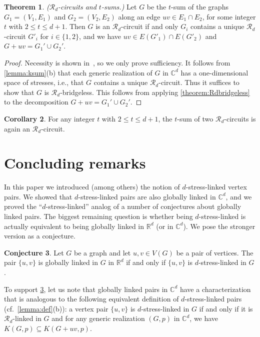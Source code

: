 \documentclass[11pt,a4paper,dvipsnames]{scrartcl}
\theoremstyle{definition}
\newtheorem{theorem}{Theorem}[section]
\newtheorem{corollary}[theorem]{Corollary}
\newtheorem{conjecture}[theorem]{Conjecture}
\newcommand{\RR}{\mathbb{R}}
\newcommand{\CC}{\mathbb{C}}
\newcommand{\strongly}[1]{${#1}$-stress-linked}
\newcommand{\sharedstresskernel}[1]{K}
\begin{document}
\begin{theorem}\label{theorem:tsumcircuitstronger} \emph{($\mathcal{R}_d$-circuits and $t$-sums.)} \newline
    Let $G$ be the $t$-sum of the graphs $G_1 = (V_1,E_1)$ and $G_2 = (V_2,E_2)$ along an edge $uv \in E_1 \cap E_2$, for some integer $t$ with $2 \leq t \leq d+1$. Then $G$ is an $\mathcal{R}_d$-circuit if and only $G_i$ contains a unique $\mathcal{R}_d$-circuit $G'_i$ for $i \in \{1,2\}$, and we have $uv \in E(G'_1) \cap E(G'_2)$ and $G+uv = G_1' \cup G_2'$.
\end{theorem}
\begin{proof}
    Necessity is shown in~\cite[Lemma 1]{grasegger.etal_2023}, so we only prove sufficiency. It follows from \cref{lemma:ksum}(b) that each generic realization of $G$ in $\CC^d$ has a one-dimensional space of stresses, i.e., that $G$ contains a unique $\mathcal{R}_d$-circuit. Thus it suffices to show that $G$ is $\mathcal{R}_d$-bridgeless. This follows from applying \cref{theorem:Rdbridgeless} to the decomposition $G+uv = G_1' \cup G_2'$. 
\end{proof}

\begin{corollary}
    For any integer $t$ with $2 \leq t \leq d+1$, the $t$-sum of two $\mathcal{R}_d$-circuits is again an $\mathcal{R}_d$-circuit.
\end{corollary}


\section{Concluding remarks}\label{section:concluding}

In this paper we introduced (among others) the notion of \strongly{d} vertex pairs. We showed that \strongly{d} pairs are also globally linked in $\CC^d$, and we proved the ``\strongly{d}'' analog of a number of conjectures about globally linked pairs. The biggest remaining question is whether being \strongly{d} is actually equivalent to being globally linked in $\RR^d$ (or in $\CC^d$). We pose the stronger version as a conjecture.

\begin{conjecture}\label{conjecture:stresskernel}
    Let $G$ be a graph and let $u,v \in V(G)$ be a pair of vertices. The pair $\{u,v\}$ is globally linked in $G$ in $\RR^d$ if and only if  $\{u,v\}$ is \strongly{d} in $G$.
\end{conjecture}

To support \cref{conjecture:stresskernel}, let us note that globally linked pairs in $\CC^d$ have a characterization that is analogous to the following equivalent definition of \strongly{d} pairs (cf.\ \cref{lemma:def}(b)): a vertex pair $\{u,v\}$ is \strongly{d} in $G$ if and only if it is $\mathcal{R}_d$-linked in $G$ and for any generic realization $(G,p)$ in $\CC^d$, we have $\sharedstresskernel{d}(G,p) \subseteq \sharedstresskernel{d}(G+uv,p)$.
\end{document}
